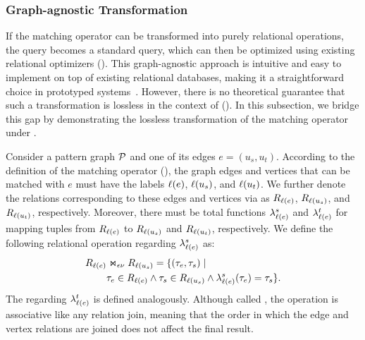 \subsubsection{Graph-agnostic Transformation}
\label{sec:intuitive-method}
If the matching operator can be transformed into purely relational operations, the \spjm query becomes a
standard \spj query, which can then be optimized using existing relational optimizers (). This graph-agnostic
approach is intuitive and easy to implement on top of existing relational databases, making it a straightforward
choice in prototyped systems~\cite{apache-age,DuckPGQ,DuckPGQ-VLDB}. However, there is no theoretical guarantee that
such a transformation is lossless in the context of \rgmapping (). In this subsection,
we bridge this gap by demonstrating the lossless transformation of the matching
operator under \rgmapping.

Consider a pattern graph $\mathcal{P}$ and one of its edges $e = (u_s, u_t)$. According to the definition of the matching operator (), the graph edges and vertices that can be matched with $e$ must have the labels $\mathcal{\ell}(e)$, $\mathcal{\ell}(u_s)$, and $\mathcal{\ell}(u_t)$. We further denote the relations corresponding to these edges and vertices via \rgmapping as $R_{\mathcal{\ell}(e)}$, $R_{\mathcal{\ell}(u_s)}$, and $R_{\mathcal{\ell}(u_t)}$, respectively. Moreover, there must be total functions $\lambda_{\mathcal{\ell}(e)}^s$ and $\lambda_{\mathcal{\ell}(e)}^t$ for mapping tuples from $R_{\mathcal{\ell}(e)}$ to $R_{\mathcal{\ell}(u_s)}$ and $R_{\mathcal{\ell}(u_t)}$, respectively. We define the following \EVjoin relational operation regarding $\lambda_{\mathcal{\ell}(e)}^s$ as:
\begin{equation} \label{eq:ev-join}
\begin{split}
R_{\mathcal{\ell}(e)} & \Join_{\epsilon\nu} R_{\mathcal{\ell}(u_s)} = \{(\tau_e, \tau_s) \;|\; \\
  &  \tau_e \in R_{\mathcal{\ell}(e)} \land \tau_s \in R_{\mathcal{\ell}(u_s)} \land \lambda_{\mathcal{\ell}(e)}^s(\tau_e) = \tau_s\}.
\end{split}
\end{equation}
The \EVjoin regarding $\lambda_{\mathcal{\ell}(e)}^t$ is defined analogously. Although called \EVjoin, the operation is associative like any relation join, meaning that the order in which the edge and vertex relations are joined does not affect the final result.


